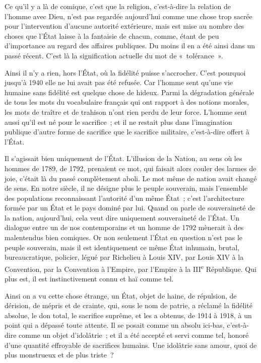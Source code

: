 \documentclass[french,twoside]{book} %
\begin{document}
Ce qu'il y a là de comique, c'est que la religion, c'est-à-dire la relation de l'homme avec Dieu, n’est pas regardée aujourd'hui comme une chose trop sacrée pour l'intervention d'aucune autorité extérieure, mais est mise au nombre des choses que l'État laisse à la fantaisie de chacun, comme, étant de peu d'importance au regard des affaires publiques. Du moins il en a été ainsi dans un passé récent. C'est là la signification actuelle du mot de « tolérance ».\par
Ainsi il n'y a rien, hors l'État, où la fidélité puisse s'accrocher. C'est pourquoi jusqu’à 1940 elle ne lui avait pas été refusée. Car l'homme sent qu'une vie humaine sans fidélité est quelque chose de hideux. Parmi la dégradation générale de tous les mots du vocabulaire français qui ont rapport à des notions morales, les mots de traître et de trahison n'ont rien perdu de leur force. L'homme sent aussi qu'il est né pour le sacrifice ; et il ne restait plus dans l'imagination publique d'autre forme de sacrifice que le sacrifice militaire, c'est-à-dire offert à l'État.\par
Il s'agissait bien uniquement de l'État. L'illusion de la Nation, au sens où les hommes de 1789, de 1792, prenaient ce mot, qui faisait alors couler des larmes de joie, c'était là du passé complètement aboli. Le mot même de nation avait changé de sens. En notre siècle, il ne désigne plus le peuple souverain, mais l'ensemble des populations reconnaissant l'autorité d'un même État ; c'est l'architecture formée par un État et le pays dominé par lui. Quand on parle de souveraineté de la nation, aujourd'hui, cela veut dire uniquement souveraineté de l’État. Un dialogue entre un de nos contemporains et un homme de 1792 mènerait à des malentendus bien comiques. Or non seulement l'État en question n'est pas le peuple souverain, mais il est identiquement ce même État inhumain, brutal, bureaucratique, policier, légué par Richelieu à Louis XIV, par Louis XIV à la Convention, par la Convention à l'Empire, par l'Empire à la III\textsuperscript{e} République. Qui plus est, il est instinctivement connu et haï comme tel.\par
Ainsi on a vu cette chose étrange, un État, objet de haine, de répulsion, de dérision, de mépris et de crainte, qui, sous le nom de patrie, a réclamé la fidélité absolue, le don total, le sacrifice suprême, et les a obtenus, de 1914 à 1918, à un point qui a dépassé toute attente. Il se posait comme un absolu ici-bas, c'est-à-dire comme un objet d'idolâtrie ; et il a été accepté et servi comme tel, honoré d'une quantité effroyable de sacrifices humains. Une idolâtrie sans amour, quoi de plus monstrueux et de plus triste ?\par
\end{document}
